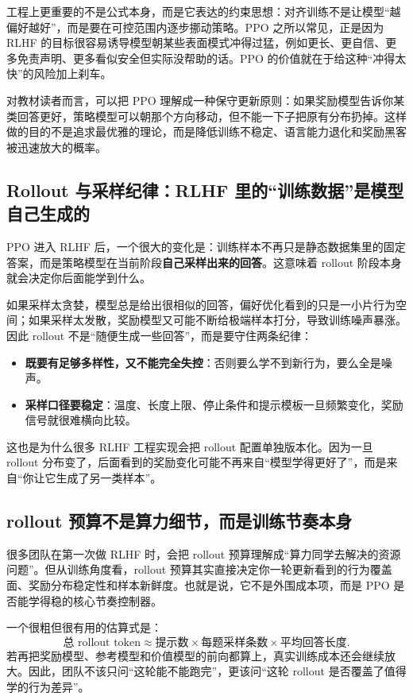 工程上更重要的不是公式本身，而是它表达的约束思想：对齐训练不是让模型“越偏好越好”，而是要在可控范围内逐步挪动策略。PPO 之所以常见，正是因为 RLHF 的目标很容易诱导模型朝某些表面模式冲得过猛，例如更长、更自信、更多免责声明、更多看似安全但实际没帮助的话。PPO 的价值就在于给这种“冲得太快”的风险加上刹车。

对教材读者而言，可以把 PPO 理解成一种保守更新原则：如果奖励模型告诉你某类回答更好，策略模型可以朝那个方向移动，但不能一下子把原有分布扔掉。这样做的目的不是追求最优雅的理论，而是降低训练不稳定、语言能力退化和奖励黑客被迅速放大的概率。

\subsection{Rollout 与采样纪律：RLHF 里的“训练数据”是模型自己生成的}
PPO 进入 RLHF 后，一个很大的变化是：训练样本不再只是静态数据集里的固定答案，而是策略模型在当前阶段\textbf{自己采样出来的回答}。这意味着 rollout 阶段本身就会决定你后面能学到什么。

如果采样太贪婪，模型总是给出很相似的回答，偏好优化看到的只是一小片行为空间；如果采样太发散，奖励模型又可能不断给极端样本打分，导致训练噪声暴涨。因此 rollout 不是“随便生成一些回答”，而是要守住两条纪律：
\begin{itemize}
  \item \textbf{既要有足够多样性，又不能完全失控}：否则要么学不到新行为，要么全是噪声。
  \item \textbf{采样口径要稳定}：温度、长度上限、停止条件和提示模板一旦频繁变化，奖励信号就很难横向比较。
\end{itemize}

这也是为什么很多 RLHF 工程实现会把 rollout 配置单独版本化。因为一旦 rollout 分布变了，后面看到的奖励变化可能不再来自“模型学得更好了”，而是来自“你让它生成了另一类样本”。

\subsection{rollout 预算不是算力细节，而是训练节奏本身}
很多团队在第一次做 RLHF 时，会把 rollout 预算理解成“算力同学去解决的资源问题”。但从训练角度看，rollout 预算其实直接决定你一轮更新看到的行为覆盖面、奖励分布稳定性和样本新鲜度。也就是说，它不是外围成本项，而是 PPO 是否能学得稳的核心节奏控制器。

一个很粗但很有用的估算式是：
\[
\text{总 rollout token} \approx \text{提示数} \times \text{每题采样条数} \times \text{平均回答长度}.
\]
若再把奖励模型、参考模型和价值模型的前向都算上，真实训练成本还会继续放大。因此，团队不该只问“这轮能不能跑完”，更该问“这轮 rollout 是否覆盖了值得学的行为差异”。

